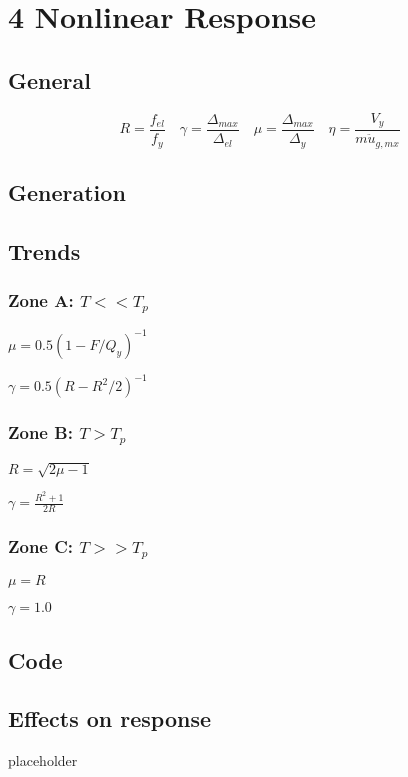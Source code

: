\hypertarget{nonlinear-response}{%
\section{4 Nonlinear Response}\label{nonlinear-response}}

\hypertarget{general}{%
\subsection{General}\label{general}}

\[R = \dfrac{f_{el}}{f_{y}} \quad \gamma = \dfrac{\Delta_{max}}{\Delta_{el}} \quad \mu = \dfrac{\Delta_{max}}{\Delta_y} \quad \eta = \dfrac{V_y}{m \ddot{u}_{g,mx}}\]

\hypertarget{generation}{%
\subsection{Generation}\label{generation}}

\hypertarget{trends}{%
\subsection{Trends}\label{trends}}

\hypertarget{zone-a-t-t_p}{%
\subsubsection{\texorpdfstring{Zone A:
\(T << T_p\)}{Zone A: T \textless\textless{} T\_p}}\label{zone-a-t-t_p}}

\(\mu = 0.5(1-F/Q_y)^{-1}\)

\(\gamma = 0.5(R-R^2/2)^{-1}\)

\hypertarget{zone-b-t-t_p}{%
\subsubsection{\texorpdfstring{Zone B:
\(T > T_p\)}{Zone B: T \textgreater{} T\_p}}\label{zone-b-t-t_p}}

\(R=\sqrt{2\mu-1}\)

\(\gamma = \frac{R^2+1}{2R}\)

\hypertarget{zone-c-t-t_p}{%
\subsubsection{\texorpdfstring{Zone C:
\(T >> T_p\)}{Zone C: T \textgreater\textgreater{} T\_p}}\label{zone-c-t-t_p}}

\(\mu = R\)

\(\gamma = 1.0\)

\hypertarget{code}{%
\subsection{Code}\label{code}}

\hypertarget{effects-on-response}{%
\subsection{Effects on response}\label{effects-on-response}}

placeholder
